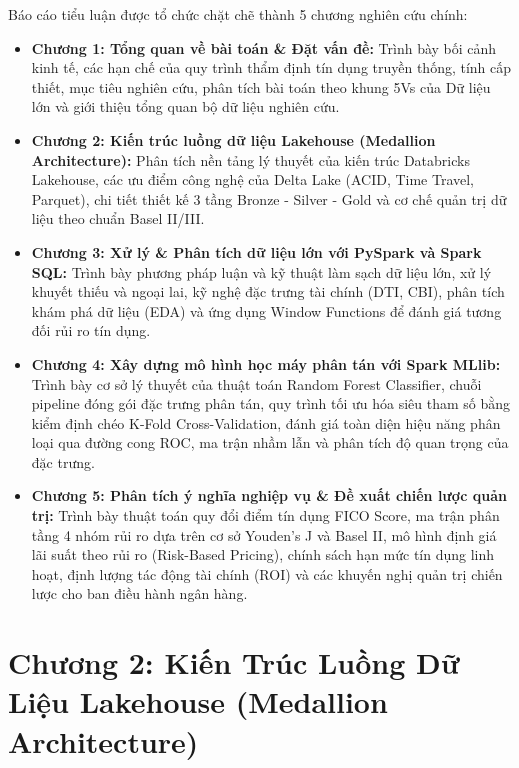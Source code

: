 \documentclass[
  13pt,
  a4paper,
]{report}
\providecommand{\tightlist}{%
  \setlength{\itemsep}{0pt}\setlength{\parskip}{0pt}}
\begin{document}
Báo cáo tiểu luận được tổ chức chặt chẽ thành 5 chương nghiên cứu chính:

\begin{itemize}
\tightlist
\item
  \textbf{Chương 1: Tổng quan về bài toán \& Đặt vấn đề:} Trình bày bối
  cảnh kinh tế, các hạn chế của quy trình thẩm định tín dụng truyền
  thống, tính cấp thiết, mục tiêu nghiên cứu, phân tích bài toán theo
  khung 5Vs của Dữ liệu lớn và giới thiệu tổng quan bộ dữ liệu nghiên
  cứu.
\item
  \textbf{Chương 2: Kiến trúc luồng dữ liệu Lakehouse (Medallion
  Architecture):} Phân tích nền tảng lý thuyết của kiến trúc Databricks
  Lakehouse, các ưu điểm công nghệ của Delta Lake (ACID, Time Travel,
  Parquet), chi tiết thiết kế 3 tầng Bronze - Silver - Gold và cơ chế
  quản trị dữ liệu theo chuẩn Basel II/III.
\item
  \textbf{Chương 3: Xử lý \& Phân tích dữ liệu lớn với PySpark và Spark
  SQL:} Trình bày phương pháp luận và kỹ thuật làm sạch dữ liệu lớn, xử
  lý khuyết thiếu và ngoại lai, kỹ nghệ đặc trưng tài chính (DTI, CBI),
  phân tích khám phá dữ liệu (EDA) và ứng dụng Window Functions để đánh
  giá tương đối rủi ro tín dụng.
\item
  \textbf{Chương 4: Xây dựng mô hình học máy phân tán với Spark MLlib:}
  Trình bày cơ sở lý thuyết của thuật toán Random Forest Classifier,
  chuỗi pipeline đóng gói đặc trưng phân tán, quy trình tối ưu hóa siêu
  tham số bằng kiểm định chéo K-Fold Cross-Validation, đánh giá toàn
  diện hiệu năng phân loại qua đường cong ROC, ma trận nhầm lẫn và phân
  tích độ quan trọng của đặc trưng.
\item
  \textbf{Chương 5: Phân tích ý nghĩa nghiệp vụ \& Đề xuất chiến lược
  quản trị:} Trình bày thuật toán quy đổi điểm tín dụng FICO Score, ma
  trận phân tầng 4 nhóm rủi ro dựa trên cơ sở Youden's J và Basel II, mô
  hình định giá lãi suất theo rủi ro (Risk-Based Pricing), chính sách
  hạn mức tín dụng linh hoạt, định lượng tác động tài chính (ROI) và các
  khuyến nghị quản trị chiến lược cho ban điều hành ngân hàng.
\end{itemize}


\chapter{Chương 2: Kiến Trúc Luồng Dữ Liệu Lakehouse (Medallion
Architecture)}\label{chux1b0ux1a1ng-2-kiux1ebfn-truxfac-luux1ed3ng-dux1eef-liux1ec7u-lakehouse-medallion-architecture}
\end{document}
